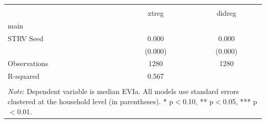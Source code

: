 \begin{tabular}{l*{2}{c}} 
\\[-1.8ex]\hline \hline \\[-1.8ex] 
& \multicolumn{1}{c}{xtreg} & 
\multicolumn{1}{c}{didreg} \\ \midrule
\midrule
main                &                     &                     \\
STRV Seed           &       0.000\sym{***}&       0.000\sym{***}\\
                    &     (0.000)         &     (0.000)         \\
\midrule
Observations        &        1280         &        1280         \\
R-squared           &       0.567         &                     \\
\hline \hline \\[-1.8ex] 
\multicolumn{3}{p{\linewidth}}{\small 
\noindent \textit{Note}: Dependent variable 
is median EVIa. All models use 
standard errors clustered at the 
household level (in parentheses). 
* p$<$0.10, ** p$<$0.05, *** p$<$0.01.} 
\end{tabular}
